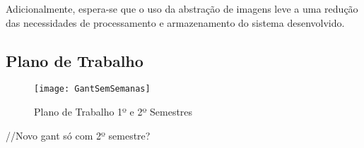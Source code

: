 Adicionalmente, espera-se que o uso da abstração de imagens leve a uma redução das necessidades de processamento e armazenamento do sistema desenvolvido.

\subsection{Plano de Trabalho}

\begin{figure}[t]
  \begin{center}
    \leavevmode
    \texttt{[image: GantSemSemanas]}
    \caption{Plano de Trabalho 1º e 2º Semestres}	
    \label{fig:planotrabalho}
  \end{center}
\end{figure}

//Novo gant só com 2º semestre?

